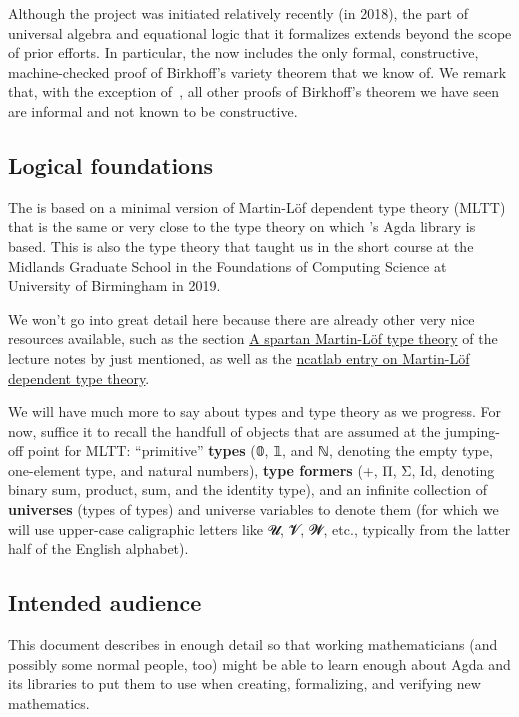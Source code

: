 Although the \agdaualib project was initiated relatively recently (in 2018), the part of universal algebra and equational logic that it formalizes extends beyond the scope of prior efforts.  In particular, the \ualib now includes the only formal, constructive, machine-checked proof of Birkhoff's variety theorem that we know of. We remark that, with the exception of~\cite{Carlstrom:2008}, all other proofs of Birkhoff's theorem we have seen are informal and not known to be constructive.


\subsection*{Logical foundations}
The \agdaualib is based on a minimal version of Martin-Löf dependent type theory (MLTT) that is the same or very close to the type theory on which \MartinEscardo's \TypeTopology Agda library is based. This is also the type theory
that \escardo taught us in the short course \ufcourse at the Midlands Graduate School in the Foundations of Computing Science at University of Birmingham in 2019.

We won't go into great detail here because there are already other very nice resources available, such as the section \href{https://www.cs.bham.ac.uk/~mhe/HoTT-UF-in-Agda-Lecture-Notes/HoTT-UF-Agda.html\#mlttinagda}{A spartan Martin-Löf type theory} of the lecture notes by \escardo just mentioned, as well as the \href{https://ncatlab.org/nlab/show/Martin-L\%C3\%B6f+dependent+type+theory}{ncatlab entry on Martin-Löf dependent type theory}.

We will have much more to say about types and type theory as we progress. For now, suffice it to recall the handfull of objects that are assumed at the jumping-off point for MLTT: ``primitive'' \textbf{types} (𝟘, 𝟙, and ℕ, denoting the empty type, one-element type, and natural numbers), \textbf{type formers} (+, Π, Σ, Id, denoting binary sum, product, sum, and the identity type), and an infinite collection of \textbf{universes} (types of types) and universe variables to denote them (for which we will use upper-case caligraphic letters like 𝓤, 𝓥, 𝓦, etc., typically from the latter half of the English alphabet).

\subsection*{Intended audience}
This document describes \agdaualib in enough detail so that working mathematicians (and possibly some normal people, too) might be able to learn enough about Agda and its libraries to put them to use when creating, formalizing, and verifying new mathematics.

